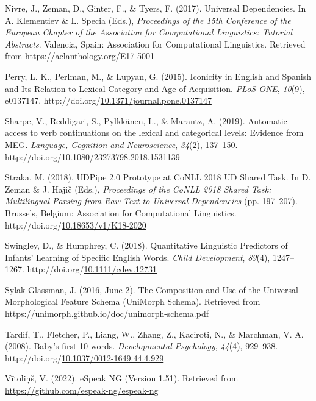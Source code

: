 \documentclass[10pt, letterpaper]{article}
\begin{document}
\begin{CSLReferences}{1}{0}
Nivre, J., Zeman, D., Ginter, F., \& Tyers, F. (2017). Universal
{Dependencies}. In A. Klementiev \& L. Specia (Eds.), \emph{Proceedings
of the 15th {Conference} of the {European Chapter} of the {Association}
for {Computational Linguistics}: {Tutorial Abstracts}}. {Valencia,
Spain}: {Association for Computational Linguistics}. Retrieved from
\url{https://aclanthology.org/E17-5001}

Perry, L. K., Perlman, M., \& Lupyan, G. (2015). Iconicity in {English}
and {Spanish} and {Its Relation} to {Lexical Category} and {Age} of
{Acquisition}. \emph{PLoS ONE}, \emph{10}(9), e0137147.
http://doi.org/\href{https://doi.org/10.1371/journal.pone.0137147}{10.1371/journal.pone.0137147}

Sharpe, V., Reddigari, S., Pylkkänen, L., \& Marantz, A. (2019).
Automatic access to verb continuations on the lexical and categorical
levels: Evidence from {MEG}. \emph{Language, Cognition and
Neuroscience}, \emph{34}(2), 137--150.
http://doi.org/\href{https://doi.org/10.1080/23273798.2018.1531139}{10.1080/23273798.2018.1531139}

Straka, M. (2018). {UDPipe} 2.0 {Prototype} at {CoNLL} 2018 {UD Shared
Task}. In D. Zeman \& J. Hajič (Eds.), \emph{Proceedings of the {CoNLL}
2018 {Shared Task}: {Multilingual Parsing} from {Raw Text} to {Universal
Dependencies}} (pp. 197--207). {Brussels, Belgium}: {Association for
Computational Linguistics}.
http://doi.org/\href{https://doi.org/10.18653/v1/K18-2020}{10.18653/v1/K18-2020}

Swingley, D., \& Humphrey, C. (2018). Quantitative {Linguistic
Predictors} of {Infants}' {Learning} of {Specific English Words}.
\emph{Child Development}, \emph{89}(4), 1247--1267.
http://doi.org/\href{https://doi.org/10.1111/cdev.12731}{10.1111/cdev.12731}

Sylak-Glassman, J. (2016, June 2). The {Composition} and {Use} of the
{Universal Morphological Feature Schema} ({UniMorph Schema}). Retrieved
from \url{https://unimorph.github.io/doc/unimorph-schema.pdf}

Tardif, T., Fletcher, P., Liang, W., Zhang, Z., Kaciroti, N., \&
Marchman, V. A. (2008). Baby's first 10 words. \emph{Developmental
Psychology}, \emph{44}(4), 929--938.
http://doi.org/\href{https://doi.org/10.1037/0012-1649.44.4.929}{10.1037/0012-1649.44.4.929}

Vītoliņš, V. (2022). {eSpeak NG} (Version 1.51). Retrieved from
\url{https://github.com/espeak-ng/espeak-ng}

\end{CSLReferences}


\end{document}
